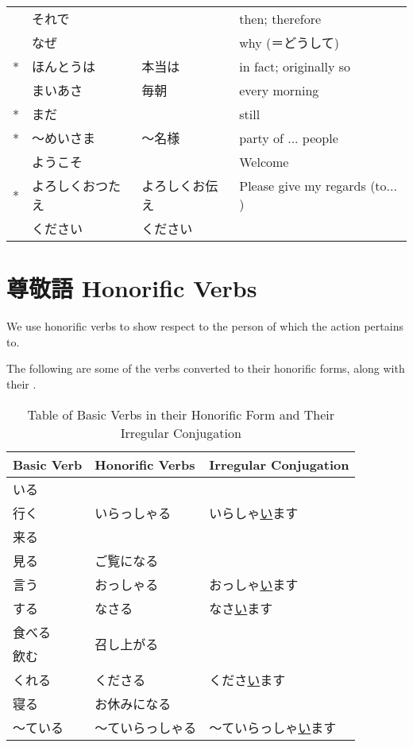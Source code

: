 \documentclass[notoc,notitlepage]{tufte-book}
\begin{document}
\begin{longtable}{r l l l}
  & それで           &                & then; therefore \\
  & なぜ             &                & why (＝どうして) \\
* & ほんとうは       & 本当は         & in fact; originally so \\
  & まいあさ         & 毎朝           & every morning \\
* & まだ             &                & still \\
* & 〜めいさま       & 〜名様         & party of ... people \\
  & ようこそ         &                & Welcome \\
* & よろしくおつたえ & よろしくお伝え & Please give my regards (to... ) \\
  & ください         & ください       &
\end{longtable}


\section{尊敬語 Honorific Verbs}%
\label{sec:sonkeigo_honorific_verbs}

We use honorific verbs to show respect to the person
of which the action pertains to.

The following are some of the verbs converted to their
honorific forms, along with their .

\begin{table}[ht]
  \centering
  \caption{Table of Basic Verbs in their Honorific Form and Their Irregular Conjugation}
  \label{table:table_of_basic_verbs_in_their_honorific_form_and_their_irregular_conjugation}
  \begin{tabular}{l | l l}
    Basic Verb & Honorific Verbs             & Irregular Conjugation \\
    \hline
    いる       &                             & \\
    行く       & いらっしゃる                & いらしゃ\underline{い}ます \\
    来る       &                             & \\
    \hline
    見る       & ご覧になる                  & \\
    \hline
    言う       & おっしゃる                  & おっしゃ\underline{い}ます \\
    \hline
    する       & なさる                      & なさ\underline{い}ます \\
    \hline
    食べる     & \multirow{2}{*}{召し上がる} & \\
    飲む       &                             & \\
    \hline
    くれる     & くださる                    & くださ\underline{い}ます \\
    \hline
    寝る       & お休みになる                & \\
    \hline
    〜ている   & 〜ていらっしゃる            & 〜ていらっしゃ\underline{い}ます
  \end{tabular}
\end{table}
\end{document}
